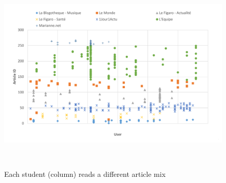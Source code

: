 % 
% 


  

\begin{figure}[h!]
\centering
  \includegraphics[width=\columnwidth,trim={24 20 40 20},clip]{figures/users_articles_color}
  \caption{Each student (column) reads a different article mix}~\label{fig:articles_read}
\end{figure}
